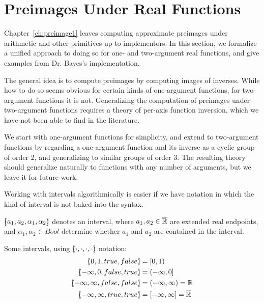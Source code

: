 \section{Preimages Under Real Functions}
\label{sec:preimages-under-real-functions}

\newcommand{\cl}[1]{\overline{\vphantom{i}{#1}}}
\newcommand{\sub}[1]{_{_{#1}}}

Chapter~\ref{ch:preimage1} leaves computing approximate preimages under arithmetic and other primitives up to implementors.
In this section, we formalize a unified approach to doing so for one- and two-argument real functions, and give examples from Dr. Bayes's implementation.

The general idea is to compute preimages by computing images of inverses.
While how to do so seems obvious for certain kinds of one-argument functions, for two-argument functions it is not.
Generalizing the computation of preimages under two-argument functions requires a theory of per-axis function inversion, which we have not been able to find in the literature.

We start with one-argument functions for simplicity, and extend to two-argument functions by regarding a one-argument function and its inverse as a cyclic group of order 2, and generalizing to similar groups of order 3.
The resulting theory should generalize naturally to functions with any number of arguments, but we leave it for future work.

Working with intervals algorithmically is easier if we have notation in which the kind of interval is not baked into the syntax.

\begin{definition}[interval]
$[\mspace{-4.5mu}(a_1,a_2,\alpha_1,\alpha_2)\mspace{-4.5mu}]$ denotes an interval, where $a_1,a_2 \in \cl{\Re}$ are extended real endpoints, and $\alpha_1,\alpha_2 \in Bool$ determine whether $a_1$ and $a_2$ are contained in the interval.
\end{definition}

Some intervals, using $[\mspace{-4.5mu}(\cdot,\cdot,\cdot,\cdot)\mspace{-4.5mu}]$ notation:
\begin{equation}
\begin{aligned}
	\ivl{0,1,true,false} &= [0,1) \\
	\ivl{-\infty,0,false,true} &= (-\infty,0] \\
	\ivl{-\infty,\infty,false,false} &= (-\infty,\infty) = \Re \\
	\ivl{-\infty,\infty,true,true} &= [-\infty,\infty] = \cl{\Re}
\end{aligned}
\end{equation}

